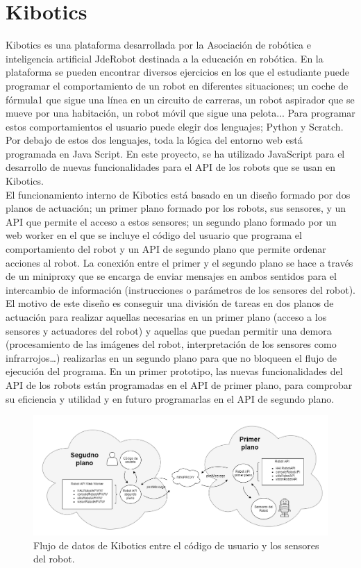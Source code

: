 \documentclass{report}
\begin{document}
\section{Kibotics}
Kibotics es una plataforma desarrollada por la Asociación de robótica e inteligencia artificial JdeRobot destinada a la educación en robótica. En la plataforma se pueden encontrar diversos ejercicios en los que el estudiante puede programar el comportamiento de un robot en diferentes situaciones; un coche de fórmula1 que sigue una línea en un circuito de carreras, un robot aspirador que se mueve por una habitación, un robot móvil que sigue una pelota... Para programar estos comportamientos el usuario puede elegir dos lenguajes; Python y Scratch. Por debajo de estos dos lenguajes, toda la lógica del entorno web está programada en Java Script. En este proyecto, se ha utilizado JavaScript para el desarrollo de nuevas funcionalidades para el API de los robots que se usan en Kibotics. 
\\

El funcionamiento interno de Kibotics está basado en un diseño formado por dos planos de actuación; un primer plano formado por los robots, sus sensores, y un API que permite el acceso a estos sensores; un segundo plano formado por un web worker en el que se incluye el código del usuario que programa el comportamiento del robot y un API de segundo plano que permite ordenar acciones al robot. La conexión entre el primer y el segundo plano se hace a través de un miniproxy que se encarga de enviar mensajes en ambos sentidos para el intercambio de información (instrucciones o parámetros de los sensores del robot). El motivo de este diseño es conseguir una división de tareas en dos planos de actuación para realizar aquellas necesarias en un primer plano (acceso a los sensores y actuadores del robot) y aquellas que puedan permitir una demora (procesamiento de las imágenes del robot, interpretación de los sensores como infrarrojos…) realizarlas en un segundo plano para que no bloqueen el flujo de ejecución del programa. En un primer prototipo, las nuevas funcionalidades del API de los robots están programadas en el API de primer plano, para comprobar su eficiencia y utilidad y en futuro programarlas en el API de segundo plano.

\renewcommand{\figurename}{Figura}		
\begin{figure}[t]
	\centering
	 \includegraphics[scale=0.4]{images/kibotics.png}
	 \caption{Flujo de datos de Kibotics entre el código de usuario y los sensores del robot.}
\end{figure}
\end{document}

